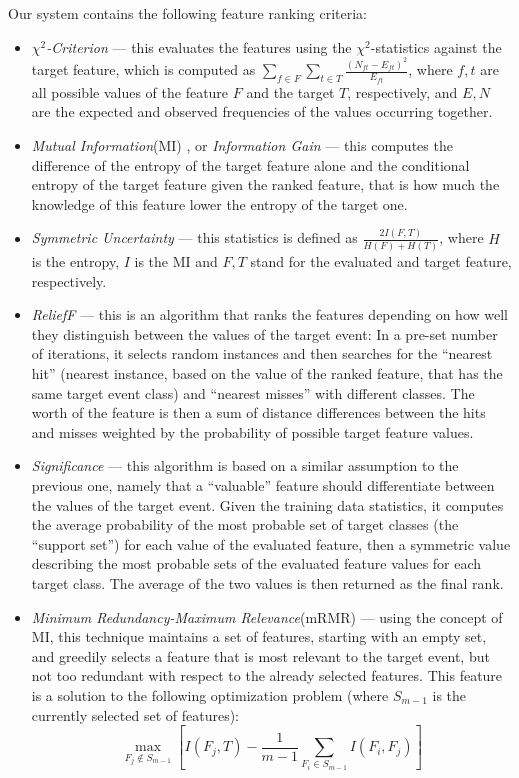 \documentclass[12pt,notitlepage]{report}
\begin{document}
Our system contains the following feature ranking criteria:
\begin{itemize}
    \item \emph{$\chi^2$-Criterion} \citep[p. 255]{manning08} --- this evaluates the features using the $\chi^2$-statistics against the target feature, which is computed as $\sum_{f\in F}\sum_{t\in T}\frac{(N_{ft}-E_{ft})^2}{E_{ft}}$, where $f,t$ are all possible values of the feature $F$ and the target $T$, respectively, and $E,N$ are the expected and observed frequencies of the values occurring together.
    \item \emph{Mutual Information}(MI) \citep[p. 583]{manning00}, or \emph{Information Gain} \citep[p. 264]{manning08} --- this computes the difference of the entropy of the target feature alone and the conditional entropy of the target feature given the ranked feature, that is how much the knowledge of this feature lower the entropy of the target one.
    \item \emph{Symmetric Uncertainty} \citep[p. 291f.]{witten05} --- this statistics is defined as $\frac{2I(F,T)}{H(F) + H(T)}$, where $H$ is the entropy, $I$ is the MI and $F,T$ stand for the evaluated and target feature, respectively.
    \item \emph{ReliefF} \citep{kira92,kononenko94} --- this is an algorithm that ranks the features depending on how well they distinguish between the values of the target event: In a pre-set number of iterations, it selects random instances and then searches for the ``nearest hit'' (nearest instance, based on the value of the ranked feature, that has the same target event class) and ``nearest misses'' with different classes. The worth of the feature is then a sum of distance differences between the hits and misses weighted by the probability of possible target feature values.
    \item \emph{Significance} \citep{ahmad05} --- this algorithm is based on a similar assumption to the previous one, namely that a ``valuable'' feature should differentiate between the values of the target event. Given the training data statistics, it computes the average probability of the most probable set of target classes (the ``support set'') for each value  of the evaluated feature, then a symmetric value describing the most probable sets of the evaluated feature values for each target class. The average of the two values is then returned as the final rank.
    \item \emph{Minimum Redundancy-Maximum Relevance}(mRMR) \citep{peng05} --- using the concept of MI, this technique maintains a set of features, starting with an empty set, and greedily selects a feature that is most relevant to the target event, but not too redundant with respect to the already selected features. This feature is a solution to the following optimization problem (where $S_{m-1}$ is the currently selected set of features):
\begin{equation}
\max_{F_j\not\in S_{m-1}} \left[ I(F_j,T) - \frac{1}{m-1} \sum_{F_i\in S_{m-1}} I(F_i,F_j)\right]
\end{equation}
\end{itemize}
\end{document}
